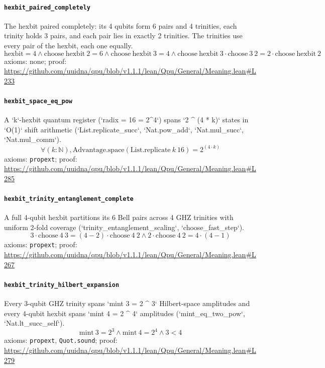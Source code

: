 \documentclass[11pt]{article}
\begin{document}
\paragraph{\texttt{hexbit\_paired\_completely}}
The hexbit paired completely: its 4 qubits form 6 pairs and 4 trinities, each trinity holds 3 pairs, and each pair lies in exactly 2 trinities. The trinities use every pair of the hexbit, each one equally.
\[ \mathrm{hexbit} = 4 \land \mathrm{choose}\ \mathrm{hexbit}\ 2 = 6 \land \mathrm{choose}\ \mathrm{hexbit}\ 3 = 4 \land \mathrm{choose}\ \mathrm{hexbit}\ 3 \cdot \mathrm{choose}\ 3\ 2 = 2 \cdot \mathrm{choose}\ \mathrm{hexbit}\ 2 \]
\noindent axioms: none; proof: \url{https://github.com/uuidna/qpu/blob/v1.1.1/lean/Qpu/General/Meaning.lean\#L233}

\paragraph{\texttt{hexbit\_space\_eq\_pow}}
A `k`-hexbit quantum register (`radix = 16 = 2\^{}4`) spans `2 \^{} (4 * k)` states in `O(1)` shift arithmetic (`List.replicate\_succ`, `Nat.pow\_add`, `Nat.mul\_succ`, `Nat.mul\_comm`).
\[ \forall (k : \mathbb{N}), \mathrm{Advantage.space} (\mathrm{List.replicate}\ k\ 16) = 2 ^{(4 \cdot k)} \]
\noindent axioms: \texttt{propext}; proof: \url{https://github.com/uuidna/qpu/blob/v1.1.1/lean/Qpu/General/Meaning.lean\#L285}

\paragraph{\texttt{hexbit\_trinity\_entanglement\_complete}}
A full 4-qubit hexbit partitions its 6 Bell pairs across 4 GHZ trinities with uniform 2-fold coverage (`trinity\_entanglement\_scaling`, `choose\_fast\_step`).
\[ 3 \cdot \mathrm{choose}\ 4\ 3 = (4 - 2) \cdot \mathrm{choose}\ 4\ 2 \land 2 \cdot \mathrm{choose}\ 4\ 2 = 4 \cdot (4 - 1) \]
\noindent axioms: \texttt{propext}; proof: \url{https://github.com/uuidna/qpu/blob/v1.1.1/lean/Qpu/General/Meaning.lean\#L267}

\paragraph{\texttt{hexbit\_trinity\_hilbert\_expansion}}
Every 3-qubit GHZ trinity spans `mint 3 = 2 \^{} 3` Hilbert-space amplitudes and every 4-qubit hexbit spans `mint 4 = 2 \^{} 4` amplitudes (`mint\_eq\_two\_pow`, `Nat.lt\_succ\_self`).
\[ \mathrm{mint}\ 3 = 2 ^{3} \land \mathrm{mint}\ 4 = 2 ^{4} \land 3 < 4 \]
\noindent axioms: \texttt{propext}, \texttt{Quot.sound}; proof: \url{https://github.com/uuidna/qpu/blob/v1.1.1/lean/Qpu/General/Meaning.lean\#L279}
\end{document}

